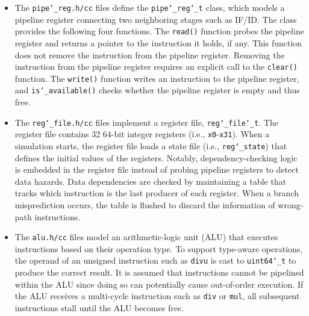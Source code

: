 \documentclass[10pt]{article}
\begin{document}
\begin{itemize}
    It parses the program code and stores the instructions as {\tt\small inst\char`_t} objects.
    The instruction memory then supplies instructions to the processor pipeline until the PC moves outside the code segment, at which point there is no valid instruction to fetch.
    PC = 0 is reserved as invalid, which makes the pipeline stop fetching instructions.
    The size of the code segment is determined by the loaded program code.
\item
    The {\tt\small pipe\char`_reg.h/cc} files define the {\tt\small pipe\char`_reg\char`_t} class, which models a pipeline register connecting two neighboring stages such as IF/ID.
    The class provides the following four functions.
    The {\tt\small read()} function probes the pipeline register and returns a pointer to the instruction it holds, if any.
    This function does not remove the instruction from the pipeline register.
    Removing the instruction from the pipeline register requires an explicit call to the {\tt\small clear()} function.
    The {\tt\small write()} function writes an instruction to the pipeline register, and {\tt\small is\char`_available()} checks whether the pipeline register is empty and thus free.
\item
    The {\tt\small reg\char`_file.h/cc} files implement a register file, {\tt\small reg\char`_file\char`_t}.
    The register file contains 32 64-bit integer registers (i.e., {\tt\small x0}-{\tt\small x31}).
    When a simulation starts, the register file loads a state file (i.e., {\tt\small reg\char`_state}) that defines the initial values of the registers.
    Notably, dependency-checking logic is embedded in the register file instead of probing pipeline registers to detect data hazards.
    Data dependencies are checked by maintaining a table that tracks which instruction is the last producer of each register.
    When a branch misprediction occurs, the table is flushed to discard the information of wrong-path instructions.
\item
    The {\tt\small alu.h/cc} files model an arithmetic-logic unit (ALU) that executes instructions based on their operation type.
    To support type-aware operations, the operand of an unsigned instruction such as {\tt\small divu} is cast to {\tt\small uint64\char`_t} to produce the correct result.
    It is assumed that instructions cannot be pipelined within the ALU since doing so can potentially cause out-of-order execution.
    If the ALU receives a multi-cycle instruction such as {\tt\small div} or {\tt\small mul}, all subsequent instructions stall until the ALU becomes free.

\end{itemize}
\end{document}
